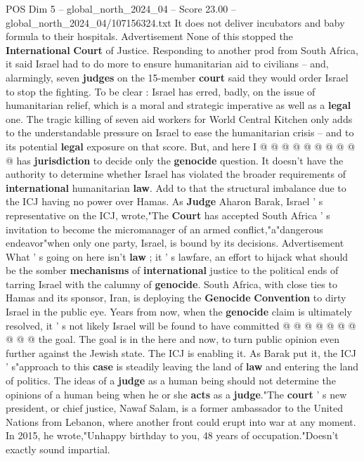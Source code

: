 \begin{textsample}{POS Dim 5 – global\_north\_2024\_04 – Score 23.00 – global\_north\_2024\_04/107156324.txt}
It does not deliver incubators and baby formula to their hospitals.
Advertisement None of this stopped the \textbf{International} \textbf{Court} of Justice.
Responding to another prod from South Africa, it said Israel had to do more to ensure humanitarian aid to civilians -- and, alarmingly, seven \textbf{judges} on the 15-member \textbf{court} said they would order Israel to stop the fighting.
To be clear : Israel has erred, badly, on the issue of humanitarian relief, which is a moral and strategic imperative as well as a \textbf{legal} one.
The tragic killing of seven aid workers for World Central Kitchen only adds to the understandable pressure on Israel to ease the humanitarian crisis -- and to its potential \textbf{legal} exposure on that score.
But, and here I @ @ @ @ @ @ @ @ @ @ has \textbf{jurisdiction} to decide only the \textbf{genocide} question.
It doesn't have the authority to determine whether Israel has violated the broader requirements of \textbf{international} humanitarian \textbf{law}.
Add to that the structural imbalance due to the ICJ having no power over Hamas.
As \textbf{Judge} Aharon Barak, Israel ' s representative on the ICJ, wrote,"The \textbf{Court} has accepted South Africa ' s invitation to become the micromanager of an armed conflict,"a"dangerous endeavor"when only one party, Israel, is bound by its decisions.
Advertisement What ' s going on here isn't \textbf{law} ; it ' s lawfare, an effort to hijack what should be the somber \textbf{mechanisms} of \textbf{international} justice to the political ends of tarring Israel with the calumny of \textbf{genocide}.
South Africa, with close ties to Hamas and its sponsor, Iran, is deploying the \textbf{Genocide} \textbf{Convention} to dirty Israel in the public eye.
Years from now, when the \textbf{genocide} claim is ultimately resolved, it ' s not likely Israel will be found to have committed @ @ @ @ @ @ @ @ @ @ the goal.
The goal is in the here and now, to turn public opinion even further against the Jewish state.
The ICJ is enabling it.
As Barak put it, the ICJ ' s"approach to this \textbf{case} is steadily leaving the land of \textbf{law} and entering the land of politics.
The ideas of a \textbf{judge} as a human being should not determine the opinions of a human being when he or she \textbf{acts} as a \textbf{judge}."The \textbf{court} ' s new president, or chief justice, Nawaf Salam, is a former ambassador to the United Nations from Lebanon, where another front could erupt into war at any moment.
In 2015, he wrote,"Unhappy birthday to you, 48 years of occupation."Doesn't exactly sound impartial.

\end{textsample}
